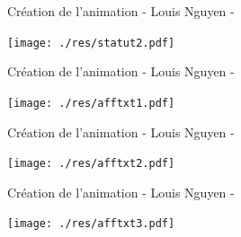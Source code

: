 \documentclass[aspectratio=169]{beamer}
\begin{document}
\begin{frame}[fragile=singleslide]{Création de l'animation \qquad \qquad \qquad \qquad \qquad \qquad - Louis Nguyen -}
    \begin{center}
        \texttt{[image: ./res/statut2.pdf]}
    \end{center}
\end{frame}

\begin{frame}[fragile=singleslide]{Création de l'animation \qquad \qquad \qquad \qquad \qquad \qquad - Louis Nguyen -}
    \begin{center}
        \texttt{[image: ./res/afftxt1.pdf]}
    \end{center}
\end{frame}

\begin{frame}[fragile=singleslide]{Création de l'animation \qquad \qquad \qquad \qquad \qquad \qquad - Louis Nguyen -}
    \begin{center}
        \texttt{[image: ./res/afftxt2.pdf]}
    \end{center}
\end{frame}

\begin{frame}[fragile=singleslide]{Création de l'animation \qquad \qquad \qquad \qquad \qquad \qquad - Louis Nguyen -}
    \begin{center}
        \texttt{[image: ./res/afftxt3.pdf]}
    \end{center}
\end{frame}
\end{document}
